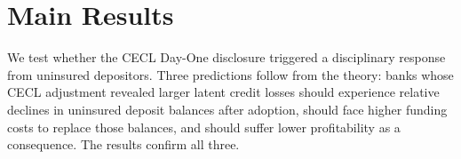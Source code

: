 
\section{Main Results}
\label{sec:results}

We test whether the CECL Day-One disclosure triggered a disciplinary response from
uninsured depositors.  Three predictions follow from the theory: banks whose CECL
adjustment revealed larger latent credit losses should experience relative declines
in uninsured deposit balances after adoption, should face higher funding costs to
replace those balances, and should suffer lower profitability as a consequence.
The results confirm all three.

